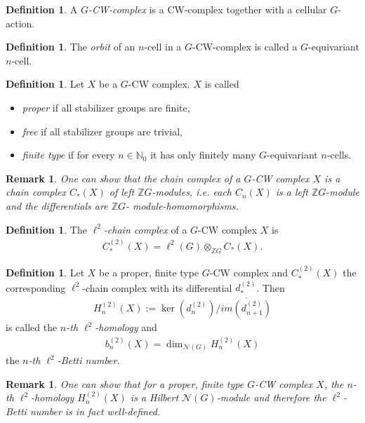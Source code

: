 \documentclass[12pt,a4paper]{scrartcl}
\theoremstyle{plain}
\newtheorem{Remark}[Theorem]{Remark}
\theoremstyle{definition}
\newtheorem{Definition}[Theorem]{Definition}
\newcommand{\Z}{\mathbb{Z}} %
\newcommand{\N}{\mathbb{N}} %
\newcommand{\2}{\mathbb{Z} / 2 \mathbb{Z}}
\newcommand{\1}{\bar{1}}
\newcommand{\0}{\bar{0}}
\begin{document}
\begin{Definition}
	A \emph{$G$-CW-complex} is a CW-complex together with a cellular $G$-action.
\end{Definition}

\begin{Definition}
	The \emph{orbit} of an $n$-cell in a $G$-CW-complex is called a $G$-equivariant $n$-cell.
\end{Definition}

\begin{Definition}
	Let $X$ be a $G$-CW complex. $X$ is called
	\begin{itemize}
		\item \emph{proper} if all stabilizer groups are finite,
		\item \emph{free} if all stabilizer groups are trivial,
		\item \emph{finite type} if for every $n \in \N_0$ it has only finitely many $G$-equivariant $n$-cells.
	\end{itemize}
\end{Definition}

\begin{Remark}
	One can show that the chain complex of a $G$-CW complex $X$ is a chain complex $C_*(X)$ of left $\Z G$-modules, i.e. each $C_n(X)$ is a left $\Z G$-module and the differentials are $\Z G$- module-homomorphisms.
\end{Remark}
\begin{Definition}
	The \emph{$\ell^2$-chain complex} of a $G$-CW complex $X$ is
	\begin{align*}
		C_*^{(2)}(X) = \ell^2(G) \otimes_{\Z G} C_*(X).
	\end{align*}
\end{Definition}

\begin{Definition}
	Let $X$ be a proper, finite type $G$-CW complex and $C_*^{(2)}(X)$ the corresponding $\ell^2$-chain complex with its differential $d_*^{(2)}$. Then 
	\begin{align*}
		H_n^{(2)}(X) := \ker(d_n^{(2)}) / \overline{im(d_{n+1}^{(2)})}
	\end{align*}
	is called the \emph{$n$-th $\ell^2$-homology} and 
	\begin{align*}
		b_n^{(2)}(X)=\dim_{\mathcal{N}(G)}H_n^{(2)}(X)
	\end{align*}
	the \emph{$n$-th $\ell^2$-Betti number}.
\end{Definition}
\begin{Remark}
	One can show that for a proper, finite type $G$-CW complex $X$, the $n$-th $\ell^2$-homology $H_n^{(2)}(X)$ is a Hilbert $\mathcal{N}(G)$-module and therefore the $\ell^2$-Betti number is in fact well-defined.
\end{Remark}
\end{document}

